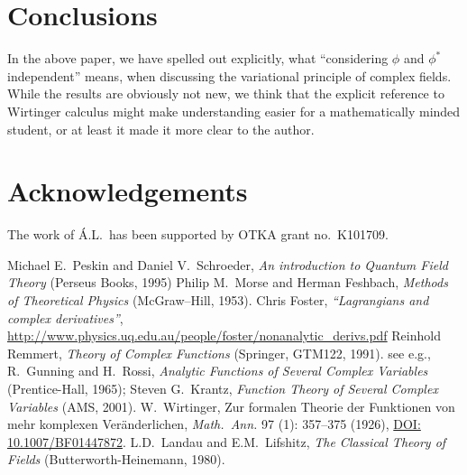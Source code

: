 \documentclass[a4paper,11pt]{article}
\def\lag{{\mathcal{L}}}
\newcommand{\arxiv}[2][]{
  \ifthenelse{\equal{#1}{}}{
    \href{http://arxiv.org/abs/#2}{\texttt{arXiv:#2}}
  }{
    \href{http://arxiv.org/abs/#2}{\texttt{arXiv:#2 [#1]}}
  } 
}
\newcommand{\doi}[1]{\href{http://dx.doi.org/#1}{DOI: #1}}
\begin{document}
\section{Conclusions}%
In the above paper, we have spelled out explicitly, what ``considering $\phi$ and $\phi^*$ independent'' means, when discussing the variational principle of complex fields.
While the results are obviously not new, we think that the explicit reference to Wirtinger calculus might make understanding easier for a mathematically minded student,
or at least it made it more clear to the author.


\section*{Acknowledgements} The work of Á.L.\ has been supported by OTKA grant no.\ K101709.

\def\refttl#1{#1, }
\begin{thebibliography}{999}
 Michael E.~Peskin and Daniel V.~Schroeder, {\sl An introduction to Quantum Field Theory} (Perseus Books, 1995)
 Philip M.~Morse and Herman Feshbach, {\sl Methods of Theoretical Physics} (McGraw--Hill, 1953).
 Chris Foster, {\sl ``Lagrangians and complex derivatives''},  \url{http://www.physics.uq.edu.au/people/foster/nonanalytic\_derivs.pdf}
 Reinhold Remmert, {\sl Theory of Complex Functions} (Springer, GTM122, 1991).
 see e.g., R.~Gunning and H.~Rossi, {\sl Analytic Functions of Several Complex Variables} (Prentice-Hall, 1965);
Steven G.~Krantz, {\sl Function Theory of Several Complex Variables} (AMS, 2001).
 W.~Wirtinger, \refttl{Zur formalen Theorie der Funktionen von mehr komplexen Ver\"anderlichen}{\sl Math.\ Ann.} 97 (1): 357–375 (1926),
\doi{10.1007/BF01447872}.
 L.D.~Landau and E.M.~Lifshitz, {\sl The Classical Theory of Fields} (Butterworth-Heinemann, 1980).
\end{thebibliography}
\end{document}
